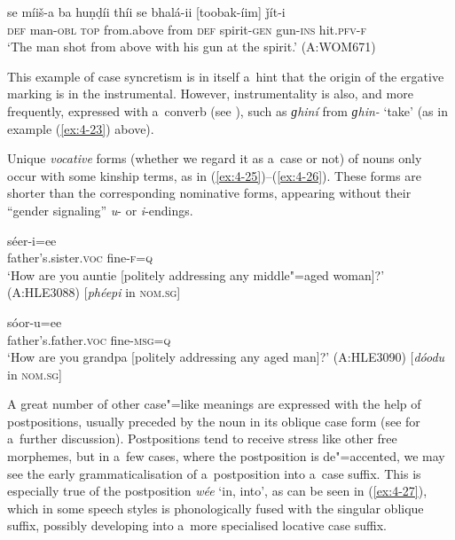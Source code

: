 \begin{exe}
\ex
\label{ex:4-24}
\gll se míiš-a ba huṇḍíi thíi se bhalá-ii [toobak-íim] ǰít-i \\
	\textsc{def} man-\textsc{obl} \textsc{top} from.above from \textsc{def} spirit-\textsc{gen} gun-\textsc{ins} hit.\textsc{pfv-f}\\
\glt `The man shot from above with his gun at the spirit.' (A:WOM671)
\end{exe}

This example of case syncretism is in itself a~hint that the origin of the ergative marking is in the instrumental. However, instrumentality is also, and more frequently, expressed with a~converb (see ), such as \textit{ɡhiní} from \textit{ɡhin-} `take' (as in example (\ref{ex:4-23}) above).


Unique \textit{vocative} forms (whether we regard it as a~case or not) of nouns only occur with some kinship terms, as in (\ref{ex:4-25})--(\ref{ex:4-26}). These forms are shorter than the corresponding nominative forms, appearing without their ``gender signaling'' \textit{u}- or \textit{i}-endings.


\begin{exe}
\ex
\label{ex:4-25}
\gll [phéep] séer-i=ee \\
	father's.sister.\textsc{voc} fine-\textsc{f=q} \\
\glt `How are you auntie [politely addressing any middle"=aged woman]?' (A:HLE3088) [\textit{phéepi} in \textsc{nom.sg}]
\end{exe}

\begin{exe}
\ex
\label{ex:4-26}
 \gll [dóod] sóor-u=ee \\
	father's.father.\textsc{voc} fine-\textsc{msg=q} \\
\glt `How are you grandpa [politely addressing any aged man]?' (A:HLE3090) [\textit{dóodu} in \textsc{nom.sg}]
\end{exe}

A great number of other case"=like meanings are expressed with the help of postpositions, usually
preceded by the noun in its oblique case form (see  for a~further discussion). Postpositions
tend to receive stress like other free morphemes, but in a~few cases, where the postposition is
de"=accented, we may see the early grammaticalisation of a~postposition into a~case suffix. This is
especially true of the postposition \textit{wée} `in, into', as can be seen in (\ref{ex:4-27}),
which in some speech styles is phonologically fused with the singular oblique suffix, possibly
developing into a~more specialised locative case suffix.

